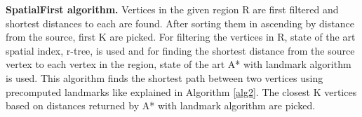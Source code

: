 \textbf{SpatialFirst algorithm. } Vertices in the given region R are first filtered and shortest distances to each are found. After sorting them in ascending by distance from the source, first K are picked. For filtering the vertices in R, state of the art spatial index, r-tree, is used and for finding the shortest distance from the source vertex to each vertex in the region, state of the art A* with landmark algorithm~\cite{AC2005} is used. This algorithm finds the shortest path between two vertices using precomputed landmarks like explained in Algorithm \ref{alg2}. The closest K vertices based on distances returned by A* with landmark algorithm are picked. 




